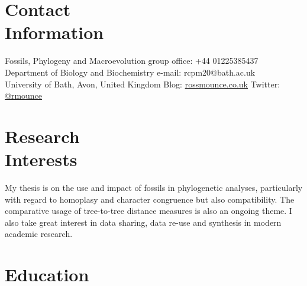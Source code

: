 \documentclass[margin,line]{resume}
\begin{document}
\begin{resume}

    \section{\mysidestyle Contact\\Information}

    Fossils, Phylogeny and Macroevolution group             \hfill office: +44 01225385437          \vspace{0mm}\\\vspace{0mm}%
    Department of Biology and Biochemistry                  \hfill e-mail: rcpm20@bath.ac.uk          \vspace{0mm}\\\vspace{0mm}%
    University of Bath, Avon, United Kingdom                \hfill Blog: \href{http://rossmounce.co.uk/}{rossmounce.co.uk} Twitter: \href{http://twitter.com/rmounce}{@rmounce}     \vspace{0mm}\\\vspace{-4.5mm}%


    \section{\mysidestyle Research\\Interests}

    My thesis is on the use and impact of fossils in phylogenetic analyses, particularly with regard to homoplasy and character congruence but also compatibility. The comparative usage of tree-to-tree distance measures is also an ongoing theme. I also take great interest in data sharing, data re-use and synthesis in modern academic research. \\

\vspace{-7 mm}


    \section{\mysidestyle Education}


\end{resume}
\end{document}
